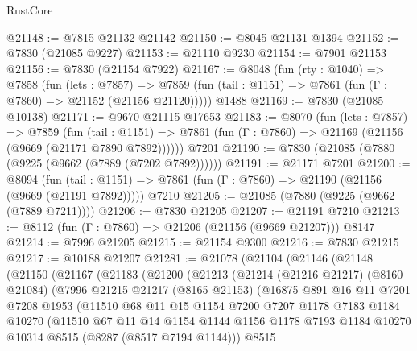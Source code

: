 \begin{lexlean}{RustCore}
\begin{coremodule}
@21148 := @7815 @21132 @21142
@21150 := @8045 @21131 @1394
@21152 := @7830 (@21085 @9227)
@21153 := @21110 @9230
@21154 := @7901 @21153
@21156 := @7830 (@21154 @7922)
@21167 := @8048
    (fun (rty : @1040) =>
    @7858
      (fun (lets : @7857) =>
      @7859 (fun (tail : @1151) => @7861 (fun (Γ : @7860) => @21152 (@21156 @21120)))))
    @1488
@21169 := @7830 (@21085 @10138)
@21171 := @9670 @21115 @17653
@21183 := @8070
    (fun (lets : @7857) =>
    @7859
      (fun (tail : @1151) =>
      @7861 (fun (Γ : @7860) => @21169 (@21156 (@9669 (@21171 @7890 @7892))))))
    @7201
@21190 := @7830 (@21085 (@7880 (@9225 (@9662 (@7889 (@7202 @7892))))))
@21191 := @21171 @7201
@21200 := @8094
    (fun (tail : @1151) => @7861 (fun (Γ : @7860) => @21190 (@21156 (@9669 (@21191 @7892)))))
    @7210
@21205 := @21085 (@7880 (@9225 (@9662 (@7889 @7211))))
@21206 := @7830 @21205
@21207 := @21191 @7210
@21213 := @8112 (fun (Γ : @7860) => @21206 (@21156 (@9669 @21207))) @8147
@21214 := @7996 @21205
@21215 := @21154 @9300
@21216 := @7830 @21215
@21217 := @10188 @21207
@21281 := @21078
    (@21104
      (@21146
        (@21148
          (@21150
            (@21167
              (@21183
                (@21200
                  (@21213
                    (@21214
                      (@21216 @21217)
                      (@8160 @21084)
                      (@7996
                        @21215
                        @21217
                        (@8165 @21153)
                        (@16875
                          @891
                          @16
                          @11
                          @7201
                          @7208
                          @1953
                          (@11510
                            @68
                            @11
                            @15
                            @1154
                            @7200
                            @7207
                            @1178
                            @7183
                            @1184
                            @10270
                            (@11510
                              @67
                              @11
                              @14
                              @1154
                              @1144
                              @1156
                              @1178
                              @7193
                              @1184
                              @10270
                              @10314
                              @8515
                              (@8287 (@8517 @7194 @1144)))
                            @8515

\end{coremodule}
\end{lexlean}
